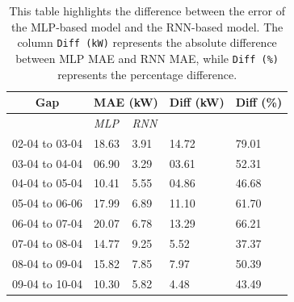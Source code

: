 \begin{table}[H]
	\centering
	\begin{tabular}{l|l|l|l|l}
		\multicolumn{1}{c|}{\textbf{Gap}}       &
		\multicolumn{2}{c|}{\textbf{MAE (kW)}}  &
		\multicolumn{1}{c|}{\textbf{Diff (kW)}} &
		\multicolumn{1}{c}{\textbf{Diff (\%)}}                                                \\ %
		\hline
		                                        & \textit{MLP} & \textit{RNN} &       &       \\
		02-04 to 03-04                          & 18.63        & 3.91         & 14.72 & 79.01 \\
		03-04 to 04-04                          & 06.90        & 3.29         & 03.61 & 52.31 \\
		04-04 to 05-04                          & 10.41        & 5.55         & 04.86 & 46.68 \\
		05-04 to 06-06                          & 17.99        & 6.89         & 11.10 & 61.70 \\
		06-04 to 07-04                          & 20.07        & 6.78         & 13.29 & 66.21 \\
		07-04 to 08-04                          & 14.77        & 9.25         & 5.52  & 37.37 \\
		08-04 to 09-04                          & 15.82        & 7.85         & 7.97  & 50.39 \\
		09-04 to 10-04                          & 10.30        & 5.82         & 4.48  & 43.49
	\end{tabular}
	\caption{This table highlights the difference between the error of the MLP-based model and the RNN-based model. The column \texttt{Diff (kW)} represents the absolute difference between MLP MAE and RNN MAE, while \texttt{Diff (\%)} represents the percentage difference.}
	\label{tab:mlpvsrnndiff}
\end{table}

